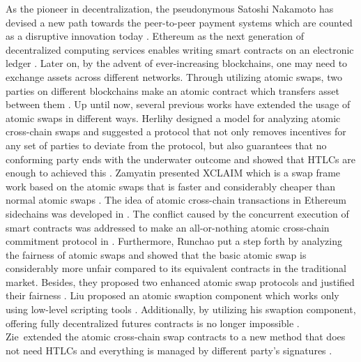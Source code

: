 As the pioneer in decentralization, the pseudonymous Satoshi Nakamoto has devised a new path towards the peer-to-peer payment systems which are counted as a disruptive innovation today \cite{nakamoto2019bitcoin}. Ethereum as the next generation of decentralized computing services enables writing smart contracts on an electronic ledger \cite{buterin2014next}. Later on, by the advent of ever-increasing blockchains, one may need to exchange assets across different networks. Through utilizing atomic swaps, two parties on different blockchains make an atomic contract which transfers asset between them \cite{htlc-btctalk}. Up until now, several previous works have extended the usage of atomic swaps in different ways. Herlihy designed a model for analyzing atomic cross-chain swaps and suggested a protocol that not only removes incentives for any set of parties to deviate from the protocol, but also guarantees that no conforming party ends with the underwater outcome and showed that HTLCs are enough to achieved this \cite{herlihy2018atomic}. Zamyatin \etal presented X{\footnotesize CLAIM} which is a swap frame work based on the atomic swaps that is faster and considerably cheaper than normal atomic swaps \cite{8835387}.
The idea of atomic cross-chain transactions in Ethereum sidechains was developed in \cite{robinson2019atomic}. The conflict caused by the concurrent execution of smart contracts was addressed to make an all-or-nothing atomic cross-chain commitment protocol in \cite{zakhary2019atomic}. Furthermore, Runchao \etal put a step forth by analyzing the fairness of atomic swaps and showed that the basic atomic swap is considerably more unfair compared to its equivalent contracts in the traditional market. Besides, they proposed two enhanced atomic swap protocols and justified their fairness \cite{10.1145/3318041.3355460}.
Liu proposed an atomic swaption component which works only using low-level scripting tools \cite{liu2018atomic}. Additionally, by utilizing his swaption component, offering fully decentralized futures contracts is no longer impossible \cite{liu2018atomic}.
Zie~\etal extended the atomic cross-chain swap contracts to a new method that does not need HTLCs and everything is managed by different party's signatures \cite{zie2019extending}.


